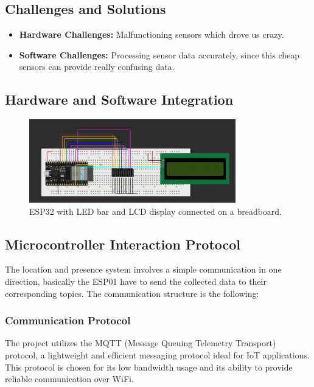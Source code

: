 \documentclass{article}
\begin{document}
\subsection{Challenges and Solutions}
\begin{itemize}
    \item \textbf{Hardware Challenges:} Malfunctioning sensors which drove us crazy.
    \item \textbf{Software Challenges:} Processing sensor data accurately, since this cheap sensors can provide really confusing data.
\end{itemize}

\subsection{Hardware and Software Integration}
\begin{figure}[ht]
    \centering
    \includegraphics[width=0.8\textwidth]{../images/activity_monitor_scheme.png}
    \caption{ESP32 with LED bar and LCD display connected on a breadboard.}
    \label{fig:esp32_system_monitor}
\end{figure}

\subsection{Microcontroller Interaction Protocol}
The location and presence system involves a simple communication in one direction, basically the ESP01 have to send the collected data to their corresponding topics. The communication structure is the following:

\subsubsection{Communication Protocol}
The project utilizes the MQTT (Message Queuing Telemetry Transport) protocol, a lightweight and efficient messaging protocol ideal for IoT applications. This protocol is chosen for its low bandwidth usage and its ability to provide reliable communication over WiFi.
\end{document}
